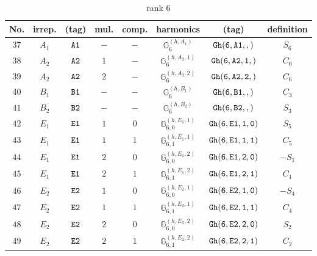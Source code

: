 \documentclass[fleqn,8pt]{jsarticle}
\begin{document}
\begin{table}[ht!]
\begin{center}
\caption{rank 6}
\renewcommand{\arraystretch}{1.3}
\begin{tabular}{cccccccc} \hline \hline
No. & irrep. & (tag) & mul. & comp. & harmonics & (tag) & definition \\ \hline
$ 37 $ & $ A_{1} $ & $ {\tt A1} $ & $ - $ & $ - $ & $ \mathbb{G}_{6}^{(h,A_{1})} $ & $ {\tt Gh(6,A1,,)} $ & $ S_{6} $ \\
$ 38 $ & $ A_{2} $ & $ {\tt A2} $ & $ 1 $ & $ - $ & $ \mathbb{G}_{6}^{(h,A_{2},1)} $ & $ {\tt Gh(6,A2,1,)} $ & $ C_{0} $ \\
$ 39 $ & $ A_{2} $ & $ {\tt A2} $ & $ 2 $ & $ - $ & $ \mathbb{G}_{6}^{(h,A_{2},2)} $ & $ {\tt Gh(6,A2,2,)} $ & $ C_{6} $ \\
$ 40 $ & $ B_{1} $ & $ {\tt B1} $ & $ - $ & $ - $ & $ \mathbb{G}_{6}^{(h,B_{1})} $ & $ {\tt Gh(6,B1,,)} $ & $ C_{3} $ \\
$ 41 $ & $ B_{2} $ & $ {\tt B2} $ & $ - $ & $ - $ & $ \mathbb{G}_{6}^{(h,B_{2})} $ & $ {\tt Gh(6,B2,,)} $ & $ S_{3} $ \\
$ 42 $ & $ E_{1} $ & $ {\tt E1} $ & $ 1 $ & $ 0 $ & $ \mathbb{G}_{6,0}^{(h,E_{1},1)} $ & $ {\tt Gh(6,E1,1,0)} $ & $ S_{5} $ \\
$ 43 $ & $ E_{1} $ & $ {\tt E1} $ & $ 1 $ & $ 1 $ & $ \mathbb{G}_{6,1}^{(h,E_{1},1)} $ & $ {\tt Gh(6,E1,1,1)} $ & $ C_{5} $ \\
$ 44 $ & $ E_{1} $ & $ {\tt E1} $ & $ 2 $ & $ 0 $ & $ \mathbb{G}_{6,0}^{(h,E_{1},2)} $ & $ {\tt Gh(6,E1,2,0)} $ & $ - S_{1} $ \\
$ 45 $ & $ E_{1} $ & $ {\tt E1} $ & $ 2 $ & $ 1 $ & $ \mathbb{G}_{6,1}^{(h,E_{1},2)} $ & $ {\tt Gh(6,E1,2,1)} $ & $ C_{1} $ \\
$ 46 $ & $ E_{2} $ & $ {\tt E2} $ & $ 1 $ & $ 0 $ & $ \mathbb{G}_{6,0}^{(h,E_{2},1)} $ & $ {\tt Gh(6,E2,1,0)} $ & $ - S_{4} $ \\
$ 47 $ & $ E_{2} $ & $ {\tt E2} $ & $ 1 $ & $ 1 $ & $ \mathbb{G}_{6,1}^{(h,E_{2},1)} $ & $ {\tt Gh(6,E2,1,1)} $ & $ C_{4} $ \\
$ 48 $ & $ E_{2} $ & $ {\tt E2} $ & $ 2 $ & $ 0 $ & $ \mathbb{G}_{6,0}^{(h,E_{2},2)} $ & $ {\tt Gh(6,E2,2,0)} $ & $ S_{2} $ \\
$ 49 $ & $ E_{2} $ & $ {\tt E2} $ & $ 2 $ & $ 1 $ & $ \mathbb{G}_{6,1}^{(h,E_{2},2)} $ & $ {\tt Gh(6,E2,2,1)} $ & $ C_{2} $ \\
 \hline \hline
\end{tabular}
\end{center}
\end{table}
\end{document}
